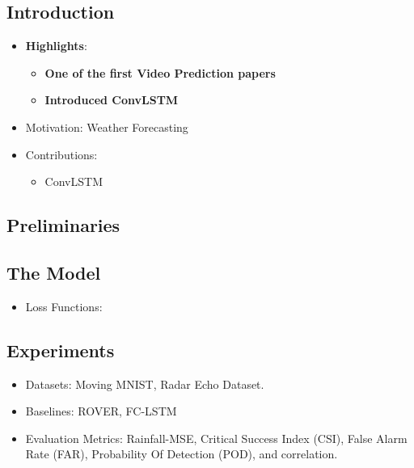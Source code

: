 \documentclass{article}
\begin{document}
    \subsection{Introduction}\label{subsec:Convolutional_LSTM_Network_A_Machine_Learning_Approach_for_Precipitation_Nowcasting:introduction}
    \begin{itemize}
        \item \textbf{Highlights}:
        \begin{itemize}
            \item \textbf{One of the first Video Prediction papers}
            \item \textbf{Introduced ConvLSTM}
        \end{itemize}
        \item Motivation: Weather Forecasting
        \item Contributions:
        \begin{itemize}
            \item ConvLSTM
        \end{itemize}
    \end{itemize}

    \subsection{Preliminaries}\label{subsec:Convolutional_LSTM_Network_A_Machine_Learning_Approach_for_Precipitation_Nowcasting:preliminaries}

    \subsection{The Model}\label{subsec:Convolutional_LSTM_Network_A_Machine_Learning_Approach_for_Precipitation_Nowcasting:model}
    \begin{itemize}
        \item Loss Functions:
    \end{itemize}

    \subsection{Experiments}\label{subsec:Convolutional_LSTM_Network_A_Machine_Learning_Approach_for_Precipitation_Nowcasting:experiments}
    \begin{itemize}
        \item Datasets: Moving MNIST, Radar Echo Dataset.
        \item Baselines: ROVER, FC-LSTM
        \item Evaluation Metrics: Rainfall-MSE, Critical Success Index (CSI), False Alarm Rate (FAR), Probability Of Detection (POD), and correlation.
    \end{itemize}
    \newpage
\end{document}

